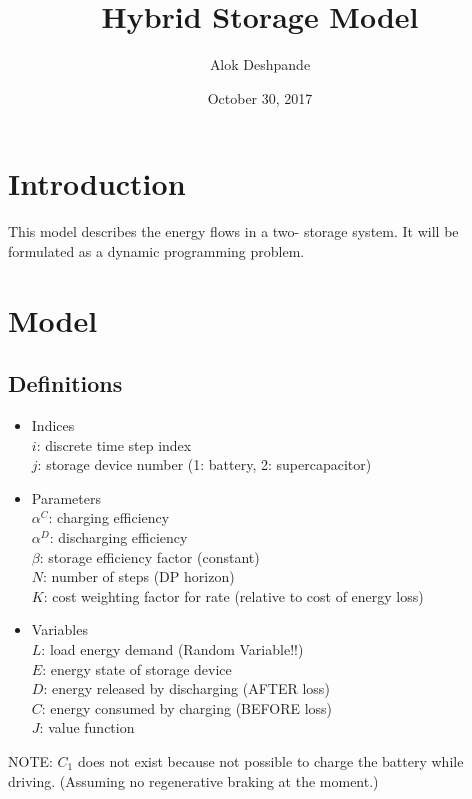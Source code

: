 \documentclass{article}
\title{Hybrid Storage Model}
\author{Alok Deshpande}
\date{October 30, 2017}
\begin{document}
	
	\maketitle
	
	\section{Introduction}
	This model describes the energy flows in a two- storage system. It will be formulated as a dynamic programming problem.
	
	\section{Model}
	
	\subsection{Definitions}
	\begin{itemize}
		\item Indices\\
		$i$: discrete time step index\\
		$j$: storage device number (1: battery, 2: supercapacitor)\\
		\item Parameters\\
		$\alpha^{C}$: charging efficiency\\
		$\alpha^{D}$: discharging efficiency\\
		$\beta$: storage efficiency factor (constant)\\
		$N$: number of steps (DP horizon)\\
		$K$: cost weighting factor for rate (relative to cost of energy loss)\\
		\item Variables\\
		$L$: load energy demand (Random Variable!!)\\
		$E$: energy state of storage device\\
		$D$: energy released by discharging (AFTER loss)\\
		$C$: energy consumed by charging (BEFORE loss)\\
		$J$: value function
	\end{itemize}
	
	NOTE: $C_{1}$ does not exist because not possible to charge the battery while driving. (Assuming no regenerative braking at the moment.)
	
\end{document}
